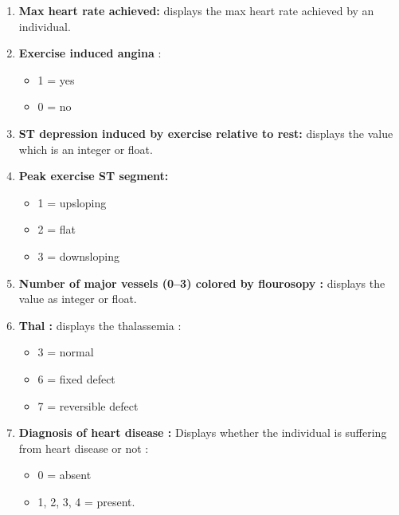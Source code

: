 \documentclass{book}
\begin{document}
\begin{enumerate}
  	\item \textbf{Max heart rate achieved:} displays the max heart rate achieved by an individual.
  	\item \textbf{Exercise induced angina} :
	  	\begin{itemize}
  			\item 1 = yes
  			\item 0 = no
  		\end{itemize}
  	
  	\item \textbf{ST depression induced by exercise relative to rest:} displays the value which is an integer or float.
  	
  	\item \textbf{Peak exercise ST segment:}
  		\begin{itemize}
	  		\item 1 = upsloping
  			\item 2 = flat
  			\item 3 = downsloping
 	 	\end{itemize}
  	
  	\item \textbf{Number of major vessels (0–3) colored by flourosopy :} displays the value as integer or float.
  	
  	\item \textbf{Thal :} displays the thalassemia :
  		\begin{itemize}
  			\item 3 = normal
  			\item 6 = fixed defect
  			\item 7 = reversible defect
  		\end{itemize}
  	
  	\item \textbf{Diagnosis of heart disease :} Displays whether the individual is suffering from heart disease or not :
  	\begin{itemize}
  		\item 0 = absent
  		\item 1, 2, 3, 4 = present.
  	\end{itemize}
  	
  \end{enumerate}
  	
  
  	
  		
\end{document}
